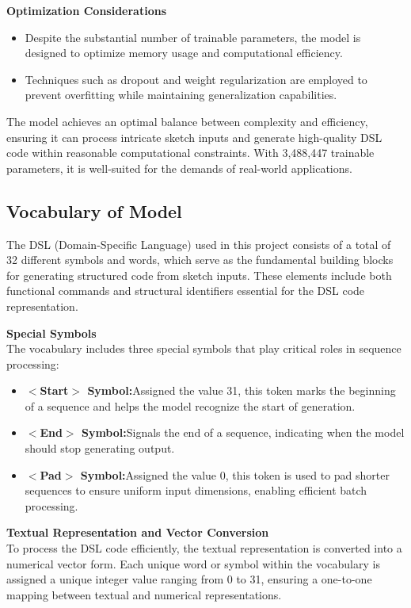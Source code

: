 \textbf{Optimization Considerations}
\begin{itemize}
    \item Despite the substantial number of trainable parameters, the model is designed to optimize memory usage and computational efficiency.
    \item Techniques such as dropout and weight regularization are employed to prevent overfitting while maintaining generalization capabilities.
\end{itemize}

The model achieves an optimal balance between complexity and efficiency, ensuring it can process intricate sketch inputs and generate high-quality DSL code within reasonable computational constraints. With 3,488,447 trainable parameters, it is well-suited for the demands of real-world applications.


\subsection{Vocabulary of Model}
The DSL (Domain-Specific Language) used in this project consists of a total of 32 different symbols and words, which serve as the fundamental building blocks for generating structured code from sketch inputs. These elements include both functional commands and structural identifiers essential for the DSL code representation.

\textbf{Special Symbols}\\
The vocabulary includes three special symbols that play critical roles in sequence processing:
\begin{itemize}
    \item \textbf{$<$Start$>$ Symbol:}Assigned the value 31, this token marks the beginning of a sequence and helps the model recognize the start of generation.
    \item \textbf{$<$End$>$ Symbol:}Signals the end of a sequence, indicating when the model should stop generating output.
    \item \textbf{$<$Pad$>$ Symbol:}Assigned the value 0, this token is used to pad shorter sequences to ensure uniform input dimensions, enabling efficient batch processing.
\end{itemize}
\textbf{Textual Representation and Vector Conversion}\\
To process the DSL code efficiently, the textual representation is converted into a numerical vector form. Each unique word or symbol within the vocabulary is assigned a unique integer value ranging from 0 to 31, ensuring a one-to-one mapping between textual and numerical representations.

